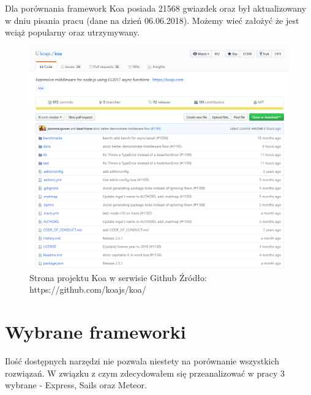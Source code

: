 \documentclass[12pt]{report}
\begin{document}
    Dla porównania framework Koa posiada 21568 gwiazdek oraz był aktualizowany w dniu pisania pracu (dane na dzień 06.06.2018).
    Możemy wieć założyć że jest wciąż popularny oraz utrzymywany.
    \begin{figure}[!hb]
      \centering
      \includegraphics[width=\textwidth,height=\textheight,keepaspectratio]{koa.png} 
      \caption{Strona projektu Koa w serwisie Github \newline Źródło: https://github.com/koajs/koa/}
    \end{figure}

  \section{Wybrane frameworki}
    Ilość dostępnych narzędzi nie pozwala niestety na porównanie wszystkich rozwiązań.
    W związku z czym zdecydowałem się przeanalizować w pracy 3 wybrane - Express, Sails oraz Meteor.
\end{document}
